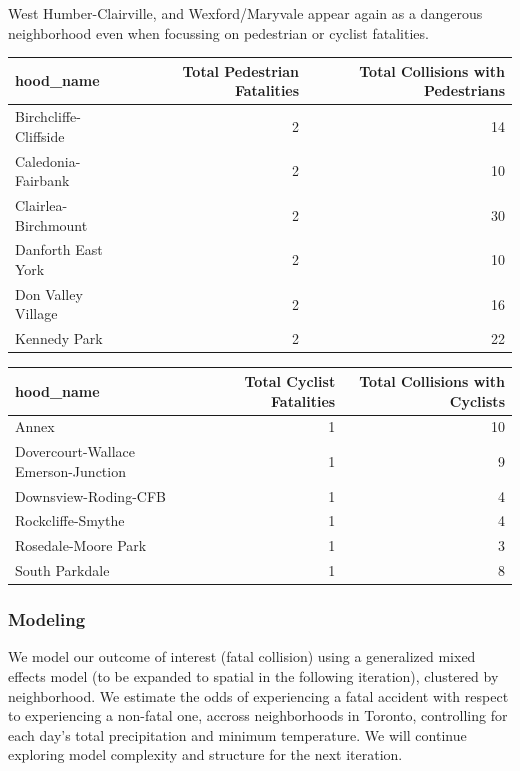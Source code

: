 \documentclass[]{article}
\begin{document}
West Humber-Clairville, and Wexford/Maryvale appear again as a dangerous
neighborhood even when focussing on pedestrian or cyclist fatalities.

\begin{table}[H]
\centering
\begin{tabular}{l|r|r}
\hline
hood\_name & Total Pedestrian Fatalities & Total Collisions with Pedestrians\\
\hline
Birchcliffe-Cliffside & 2 & 14\\
\hline
Caledonia-Fairbank & 2 & 10\\
\hline
Clairlea-Birchmount & 2 & 30\\
\hline
Danforth East York & 2 & 10\\
\hline
Don Valley Village & 2 & 16\\
\hline
Kennedy Park & 2 & 22\\
\hline
\end{tabular}
\end{table}

\begin{table}[H]
\centering
\begin{tabular}{l|r|r}
\hline
hood\_name & Total Cyclist Fatalities & Total Collisions with Cyclists\\
\hline
Annex & 1 & 10\\
\hline
Dovercourt-Wallace Emerson-Junction & 1 & 9\\
\hline
Downsview-Roding-CFB & 1 & 4\\
\hline
Rockcliffe-Smythe & 1 & 4\\
\hline
Rosedale-Moore Park & 1 & 3\\
\hline
South Parkdale & 1 & 8\\
\hline
\end{tabular}
\end{table}

\subsubsection{Modeling}\label{modeling}

We model our outcome of interest (fatal collision) using a generalized
mixed effects model (to be expanded to spatial in the following
iteration), clustered by neighborhood. We estimate the odds of
experiencing a fatal accident with respect to experiencing a non-fatal
one, accross neighborhoods in Toronto, controlling for each day's total
precipitation and minimum temperature. We will continue exploring model
complexity and structure for the next iteration.
\end{document}
